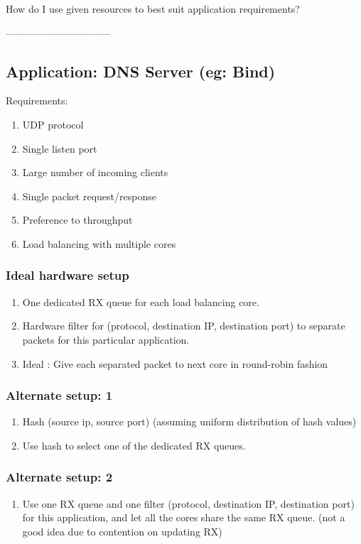 How do I use given resources to best suit application requirements?

--------------------------------
\subsection{Application:  DNS Server (eg: Bind)}
Requirements:
\begin{enumerate}
    \item UDP protocol
    \item Single listen port
    \item Large number of incoming clients
    \item Single packet request/response
    \item Preference to throughput
    \item Load balancing with multiple cores
\end{enumerate}

\subsubsection{Ideal hardware setup}
\begin{enumerate}
    \item One dedicated RX queue for each load balancing core.
    \item Hardware filter for (protocol, destination IP, destination port) to separate
    packets for this particular application.
    \item Ideal : Give each separated packet to next core in round-robin fashion
\end{enumerate}

\subsubsection{Alternate setup: 1}
\begin{enumerate}
       \item Hash (source ip, source port) (assuming uniform distribution of hash values)
       \item Use hash to select one of the dedicated RX queues.
\end{enumerate}

\subsubsection{Alternate setup: 2}
\begin{enumerate}
       \item Use one RX queue and one filter (protocol, destination IP,
        destination port) for this application, and let all the cores
        share the same RX queue.
        (not a good idea due to contention on updating RX)
\end{enumerate}

